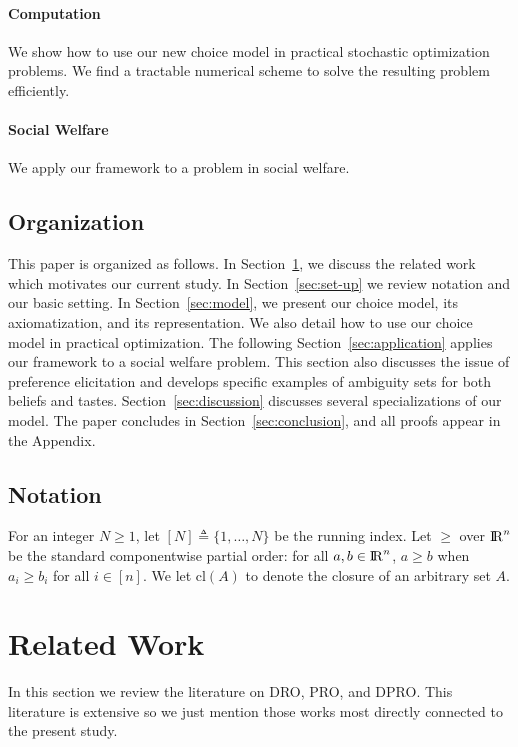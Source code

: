 \documentclass[11pt,oneside]{article}
\theoremstyle{plain}
\theoremstyle{plain}
\theoremstyle{plain}
\theoremstyle{plain}
\theoremstyle{plain}
\theoremstyle{definition}
\theoremstyle{definition}
\theoremstyle{remark}
\theoremstyle{plain}
\newcommand{\R}{{\rm I\!R}}
\begin{document}
\paragraph*{Computation}
We show how to use our new choice model in practical stochastic optimization problems. We find a tractable numerical scheme to solve the resulting problem efficiently.

\paragraph*{Social Welfare}
We apply our framework to a problem in social welfare.


\subsection{Organization}

This paper is organized as follows.
In Section~\ref{sec:related}, we discuss the related work which motivates our current study.
In Section~\ref{sec:set-up} we review notation and our basic setting.
In Section~\ref{sec:model}, we present our choice model, its axiomatization, and its representation. We also detail how to use our choice model in practical optimization.
The following Section~\ref{sec:application} applies our framework to a social welfare problem. This section also discusses the issue of preference elicitation and develops specific examples of ambiguity sets for both beliefs and tastes.
Section~\ref{sec:discussion} discusses several specializations of our model.
The paper concludes in Section~\ref{sec:conclusion}, and all proofs appear in the Appendix.

\subsection{Notation}

For an integer $N \geq 1$, let $[N] \triangleq \{1,\ldots, N\}$ be the running index. Let $\geq$ over $\R^n$ be the standard componentwise partial order:
for all $a,b \in \R^n$, $a \geq b$ when $a_i \geq b_i$ for all $i \in [n]$. We let $\text{cl}(A)$ to denote the closure of an arbitrary set $A$.


\section{Related Work}
\label{sec:related}

In this section we review the literature on DRO, PRO, and DPRO. This literature is extensive so we just mention those works most directly connected to the present study.
\end{document}
